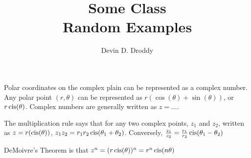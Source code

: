 \documentclass{report}
\title{\Huge{Some Class}\\Random Examples}
\author{\huge{Devin D. Droddy}}
\date{}
\begin{document}
\maketitle
\newpage%
\tableofcontents
\pagebreak

\chapter{}
\section{}
Polar coordinates on the complex plain can be represented as a complex number. Any polar point $(r,\theta)$ can be represented as $r(\cos(\theta) + \sin(\theta))$, or $r\operatorname{cis}(\theta)$. Complex numbers are generally written as $z=...$.

The multiplication rule says that for any two complex points, $z_1$ and $z_2$, written as $z=r(\operatorname{cis}(\theta))$, $z_1z_2=r_1r_2\operatorname{cis}(\theta_1+\theta_2)$. Conversely, $\frac{z_1}{z_2}=\frac{r_1}{r_2}\operatorname{cis}(\theta_1-\theta_2)$

DeMoivre's Theorem is that $z^n=(r\operatorname{cis}(\theta))^n=r^n\operatorname{cis}(n\theta)$
\end{document}

